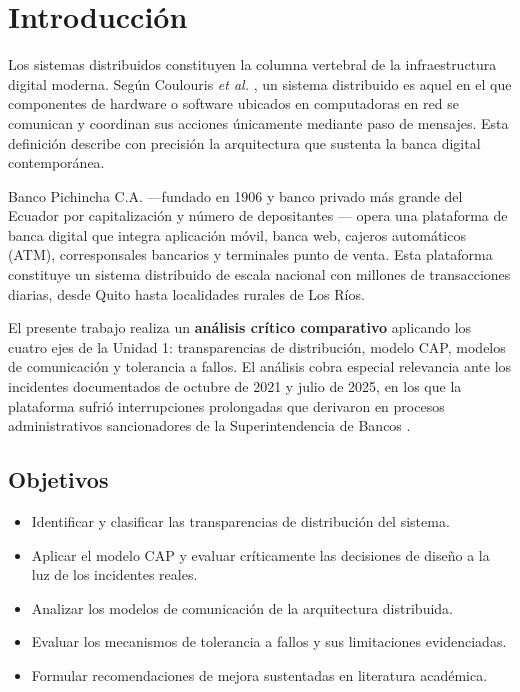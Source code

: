\documentclass[12pt,a4paper]{article}
\begin{document}
\tableofcontents
\newpage

\section{Introducci\'on}

Los sistemas distribuidos constituyen la columna vertebral de la infraestructura digital moderna. Seg\'un Coulouris \textit{et al.} \cite{Coulouris2011}, un sistema distribuido es aquel en el que componentes de hardware o software ubicados en computadoras en red se comunican y coordinan sus acciones \'unicamente mediante paso de mensajes. Esta definici\'on describe con precisi\'on la arquitectura que sustenta la banca digital contempor\'anea.

Banco Pichincha C.A. ---fundado en 1906 y banco privado m\'as grande del Ecuador por capitalizaci\'on y n\'umero de depositantes \cite{BancoPichincha2025}--- opera una plataforma de banca digital que integra aplicaci\'on m\'ovil, banca web, cajeros autom\'aticos (ATM), corresponsales bancarios y terminales punto de venta. Esta plataforma constituye un sistema distribuido de escala nacional con millones de transacciones diarias, desde Quito hasta localidades rurales de Los R\'ios.

El presente trabajo realiza un \textbf{an\'alisis cr\'itico comparativo} aplicando los cuatro ejes de la Unidad 1: transparencias de distribuci\'on, modelo CAP, modelos de comunicaci\'on y tolerancia a fallos. El an\'alisis cobra especial relevancia ante los incidentes documentados de octubre de 2021 y julio de 2025, en los que la plataforma sufri\'o interrupciones prolongadas que derivaron en procesos administrativos sancionadores de la Superintendencia de Bancos \cite{SuperbancosIncidente2021, SuperbancosSancion2025}.

\subsection{Objetivos}

\begin{itemize}[leftmargin=1.5cm, itemsep=2pt]
  \item Identificar y clasificar las transparencias de distribuci\'on del sistema.
  \item Aplicar el modelo CAP y evaluar cr\'iticamente las decisiones de dise\~no a la luz de los incidentes reales.
  \item Analizar los modelos de comunicaci\'on de la arquitectura distribuida.
  \item Evaluar los mecanismos de tolerancia a fallos y sus limitaciones evidenciadas.
  \item Formular recomendaciones de mejora sustentadas en literatura acad\'emica.
\end{itemize}
\end{document}
